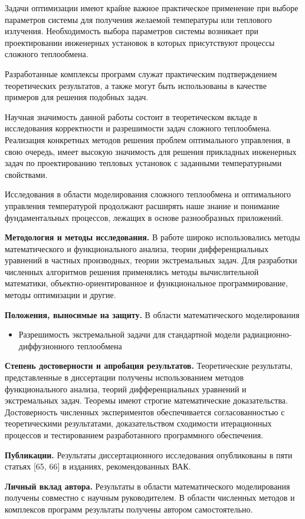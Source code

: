 Задачи оптимизации имеют крайне важное практическое применение при выборе параметров системы для
получения желаемой температуры или теплового излучения.
Необходимость выбора параметров системы возникает при проектировании инженерных установок
в которых присутствуют процессы сложного теплообмена.

Разработанные комплексы программ служат практическим подтверждением теоретических результатов,
а также могут быть использованы в качестве примеров для решения подобных задач.


Научная значимость данной работы состоит в теоретическом вкладе
в исследования корректности и разрешимости задач сложного теплообмена.
Реализация конкретных методов решения проблем оптимального управления,
в свою очередь, имеет высокую
значимость для решения прикладных инженерных задач по проектированию
тепловых установок с заданными температурными свойствами.


Исследования в области моделирования сложного теплообмена и оптимального управления
температурой продолжают расширять наше знание и понимание фундаментальных процессов,
лежащих в основе разнообразных приложений.

\textbf{Методология и методы исследования.}
В работе широко использовались методы математического и
функционального анализа, теории дифференциальных
уравнений в частных производных, теории экстремальных задач.
Для разработки численных алгоритмов решения
применялись методы вычислительной математики,
объектно-ориентированное и функциональное программирование,
методы оптимизации и другие.


\textbf{Положения, выносимые на защиту.}
В области математического моделирования
\begin{itemize}
    \item Разрешимость экстремальной задачи для стандартной модели радиационно-диффузионного теплообмена
\end{itemize}


\textbf{Степень достоверности и апробация результатов.}
Теоретические результаты, представленные в диссертации получены
использованием методов функционального анализа, теорий
дифференциальных уравнений и экстремальных задач.
Теоремы имеют строгие математические доказательства.
Достоверность численных экспериментов обеспечивается согласованностью
с теоретическими результатами, доказательством
сходимости итерационных процессов и тестированием разработанного программного обеспечения.

\textbf{Публикации.}
Результаты диссертационного исследования опубликованы в пяти статьях
[65, 66] в изданиях, рекомендованных ВАК.


\textbf{Личный вклад автора.}
Результаты в области математического моделирования получены совместно с научным руководителем.
В области численных методов и комплексов программ результаты получены автором самостоятельно.
